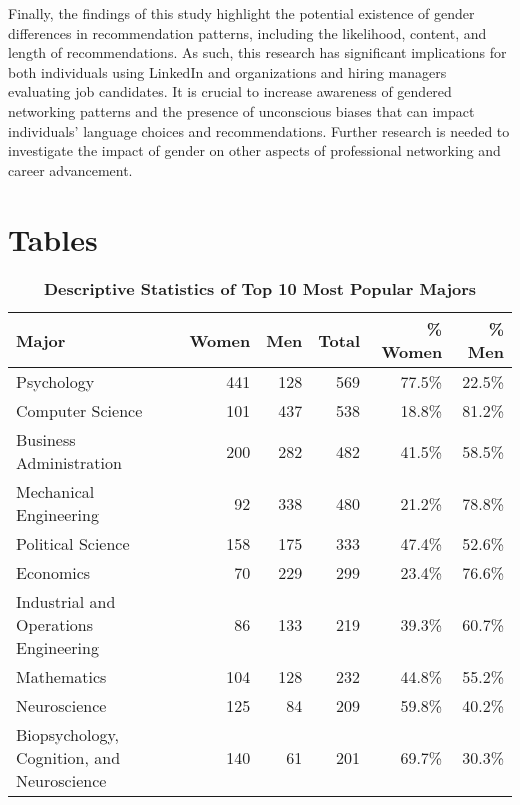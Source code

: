 \documentclass[12pt]{caltech_thesis}
\begin{document}
Finally, the findings of this study highlight the potential existence of gender differences in recommendation patterns, including the likelihood, content, and length of recommendations. As such, this research has significant implications for both individuals using LinkedIn and organizations and hiring managers evaluating job candidates. It is crucial to increase awareness of gendered networking patterns and the presence of unconscious biases that can impact individuals' language choices and recommendations. Further research is needed to investigate the impact of gender on other aspects of professional networking and career advancement.



\chapter{Tables}
\setcounter{table}{0}
\renewcommand{\thetable}{\arabic{table}}
\begin{table*}[htbp]
   \begin{center}
   \centering
   \caption{\textbf{Descriptive Statistics of Top 10 Most Popular Majors}}
   \label{Table 1}
   \renewcommand{\arraystretch}{2.0}
   \begin{tabular}{lrrrrr}
     \toprule
     \textbf{Major} & \textbf{Women} & \textbf{Men} & \textbf{Total} & \textbf{\% Women} & \textbf{\% Men} \\
     \midrule
     Psychology & 441   & 128   & 569   & 77.5\% & 22.5\% \\
     Computer Science & 101   & 437   & 538   & 18.8\% & 81.2\% \\
     Business Administration & 200   & 282   & 482   & 41.5\% & 58.5\% \\
     Mechanical Engineering & 92    & 338   & 480   & 21.2\% & 78.8\% \\
     Political Science & 158   & 175   & 333   & 47.4\% & 52.6\% \\
     Economics & 70    & 229   & 299   & 23.4\% & 76.6\% \\
     Industrial and Operations Engineering & 86    & 133   & 219   & 39.3\% & 60.7\% \\
     Mathematics & 104   & 128   & 232   & 44.8\% & 55.2\% \\
     Neuroscience & 125   & 84    & 209   & 59.8\% & 40.2\% \\
     Biopsychology, Cognition, and Neuroscience & 140   & 61    & 201   & 69.7\% & 30.3\% \\
     \bottomrule
   \end{tabular}%
   \label{tab:stats}%
   \end{center}
 \end{table*}%
 \restoregeometry
\end{document}
